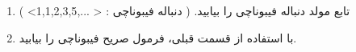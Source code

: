\p
\begin{enumerate}
\item
تابع مولد دنباله فیبوناچی را بیابید.
		( دنباله فیبوناچی : < ...,1,1,2,3,5> )
\item	
		با استفاده از قسمت قبلی، فرمول صریح فیبوناچی را بیابید.
\end{enumerate}
